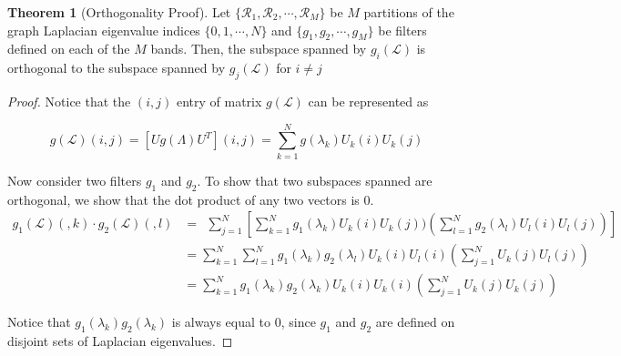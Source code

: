 \documentclass[a4paper]{article}
\newcommand{\R}{\mathcal{R}}
\newcommand{\La}{\mathcal{L}}
\theoremstyle{definition}
\newtheorem*{thm}{Theorem}
\begin{document}
\begin{thm}[Orthogonality Proof]

Let $\{\R_1, \R_2, \cdots, \R_M\}$ be $M$ partitions of the graph Laplacian eigenvalue indices $\{0, 1, \cdots,  N \}$ and $\{g_1, g_2, \cdots, g_M \}$ be filters defined on each of the $M$ bands. Then, the subspace spanned by $g_i(\La)$ is orthogonal to the subspace spanned by $g_j(\La)$ for $i \neq j$

\end{thm}

\begin{proof}


Notice that the $(i,j)$ entry of matrix $g(\La)$ can be represented as 

$$g(\La) (i,j) = [Ug(\Lambda)U^T] (i,j) = \sum_{k = 1}^{N} g(\lambda_k) U_k(i) U_k(j)$$

Now consider two filters $g_1$ and $g_2$. To show that two subspaces spanned are orthogonal, we show that the dot product of any two vectors is 0.
\begin{align*}
g_1(\La)(,k) \cdot g_2(\La)(,l)&=\ \  \sum_{j = 1}^{N} [\sum_{k = 1}^{N} g_1(\lambda_k) U_k(i) U_k(j) )( \sum_{l = 1}^{N} g_2(\lambda_l) U_l(i) U_l(j)) ] \\
& = \sum_{k = 1}^{N} \sum_{l = 1}^{N} g_1(\lambda_k) g_2(\lambda_l)  U_k(i) U_l(i) ( \sum_{j = 1}^{N}  U_k(j)  U_l(j))  \\
& = \sum_{k = 1}^{N} g_1(\lambda_k) g_2(\lambda_k)  U_k(i) U_k(i) ( \sum_{j = 1}^{N}  U_k(j)  U_k(j)) 
\end{align*}

Notice that $g_1(\lambda_k) g_2(\lambda_k)$ is always equal to $0$, since $g_1$ and $g_2$ are defined on disjoint sets of Laplacian eigenvalues.   

\end{proof}






\end{document}
